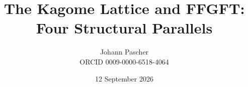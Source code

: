 \documentclass[11pt,a4paper]{report}
\title{The Kagome Lattice and FFGFT:\\[0.5em]
  \large Four Structural Parallels}
\date{12 September 2026}
\author{Johann Pascher\\\small ORCID 0009-0000-6518-4064}
\begin{document}
\renewcommand{\thechapter}{}
\renewcommand{\thesection}{\arabic{section}}
\maketitle
\tableofcontents

\end{document}
